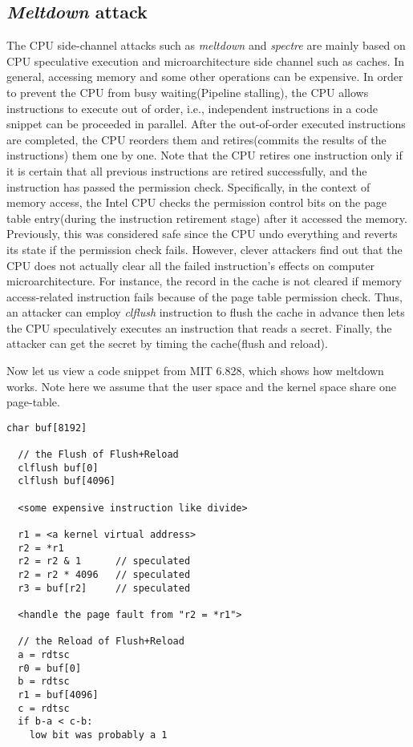  
 
 
 

 

 




 
 
\subsection{\emph{Meltdown} attack}

The CPU side-channel attacks such as \emph{meltdown}\cite{3} and \emph{spectre}\cite{4} are mainly based on 
CPU speculative execution and microarchitecture side channel such as caches. 
In general, accessing memory and some other operations can be expensive. 
In order to prevent the CPU from busy waiting(Pipeline stalling), 
the CPU allows instructions to execute out of order, i.e., independent 
instructions in a code snippet can be proceeded in parallel. After the out-of-order 
executed instructions are completed,  the CPU reorders them and retires(commits the 
results of the instructions) them one by one. Note that the CPU retires one instruction 
only if it is certain that all previous instructions are retired successfully, and the 
instruction has passed the permission check.  Specifically, in the context of memory access, 
the Intel CPU checks the permission control bits on the page table entry(during the 
instruction retirement stage) after it accessed the memory. 
Previously, this was considered safe since the CPU undo everything and reverts 
its state if the permission check fails.
However, clever attackers find out that the CPU does not actually clear all the 
failed instruction's effects on computer microarchitecture. For instance, 
the record in the cache is not cleared if memory access-related instruction 
fails because of the page table permission check. Thus, an attacker can employ 
\emph{clflush} instruction to flush the cache in advance then lets the CPU speculatively 
executes an instruction that reads a secret. Finally, the attacker can get the secret 
by timing the cache(flush and reload\cite{11}).

Now let us view a code snippet from MIT 6.828\cite{1}, which shows how meltdown works. Note here we assume that the user space and the 
kernel space share one page-table. 
\begin{lstlisting}[style=CStyle]
  char buf[8192]

  // the Flush of Flush+Reload
  clflush buf[0]
  clflush buf[4096]

  <some expensive instruction like divide>

  r1 = <a kernel virtual address>
  r2 = *r1
  r2 = r2 & 1      // speculated
  r2 = r2 * 4096   // speculated
  r3 = buf[r2]     // speculated

  <handle the page fault from "r2 = *r1">

  // the Reload of Flush+Reload
  a = rdtsc
  r0 = buf[0]
  b = rdtsc
  r1 = buf[4096]
  c = rdtsc
  if b-a < c-b:
    low bit was probably a 1
\end{lstlisting}

